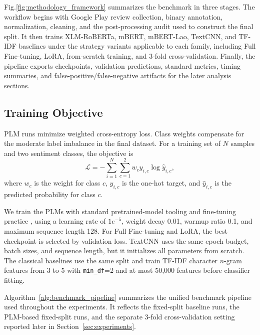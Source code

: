 \documentclass[conference, onecolumn]{IEEEtran}
\begin{document}
Fig.\ref{fig:methodology_framework} summarizes the benchmark in three stages. The workflow begins with Google Play review collection, binary annotation, normalization, cleaning, and the post-processing audit used to construct the final split. It then trains XLM-RoBERTa, mBERT, mBERT-Lao, TextCNN, and TF-IDF baselines under the strategy variants applicable to each family, including Full Fine-tuning, LoRA, from-scratch training, and 3-fold cross-validation. Finally, the pipeline exports checkpoints, validation predictions, standard metrics, timing summaries, and false-positive/false-negative artifacts for the later analysis sections.

\subsection{Training Objective}
\label{subsec:training_objective}

PLM runs minimize weighted cross-entropy loss. Class weights compensate for the moderate label imbalance in the final dataset. For a training set of $N$ samples and two sentiment classes, the objective is
\begin{equation}
\mathcal{L} = - \sum_{i=1}^{N}\sum_{c=1}^{2} w_c y_{i,c}\log \hat{y}_{i,c},
\label{eq:loss}
\end{equation}
where $w_c$ is the weight for class $c$, $y_{i,c}$ is the one-hot target, and $\hat{y}_{i,c}$ is the predicted probability for class $c$.

We train the PLMs with standard pretrained-model tooling and fine-tuning practice \cite{han2021pre,min2023recent}, using a learning rate of $1e^{-5}$, weight decay 0.01, warmup ratio 0.1, and maximum sequence length 128. For Full Fine-tuning and LoRA, the best checkpoint is selected by validation loss. TextCNN uses the same epoch budget, batch sizes, and sequence length, but it initializes all parameters from scratch. The classical baselines use the same split and train TF-IDF character $n$-gram features from 3 to 5 with \texttt{min\_df}=2 and at most 50,000 features before classifier fitting.

Algorithm~\ref{alg:benchmark_pipeline} summarizes the unified benchmark pipeline used throughout the experiments. It reflects the fixed-split baseline runs, the PLM-based fixed-split runs, and the separate 3-fold cross-validation setting reported later in Section~\ref{sec:experiments}.
\end{document}
